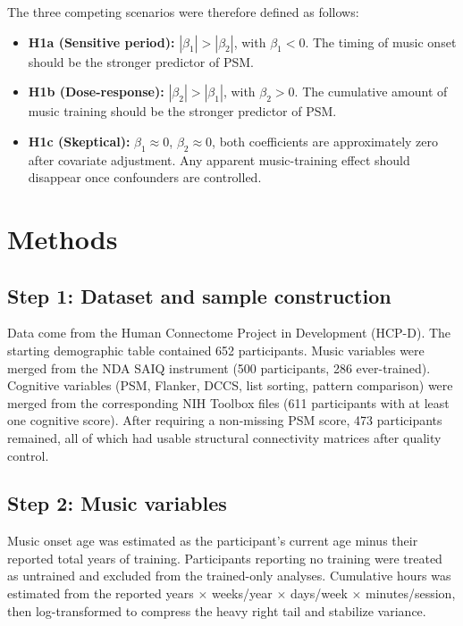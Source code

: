 \documentclass[11pt]{article}
\begin{document}
The three competing scenarios were therefore defined as follows:
\begin{itemize}[leftmargin=1.4em,itemsep=2pt]
  \item \textbf{H1a (Sensitive period):} $|\beta_1| > |\beta_2|$, with $\beta_1 < 0$.
  The timing of music onset should be the stronger predictor of PSM.
  \item \textbf{H1b (Dose-response):} $|\beta_2| > |\beta_1|$, with $\beta_2 > 0$.
  The cumulative amount of music training should be the stronger predictor of PSM.
  \item \textbf{H1c (Skeptical):} $\beta_1\approx 0$, $\beta_2\approx 0$, both coefficients are approximately zero after covariate adjustment.
  Any apparent music-training effect should disappear once confounders are controlled.
\end{itemize}

\section{Methods}

\subsection{Step 1: Dataset and sample construction}
Data come from the Human Connectome Project in Development (HCP-D). The starting demographic table contained 652 participants. Music variables were merged from the NDA SAIQ instrument (500 participants, 286 ever-trained). Cognitive variables (PSM, Flanker, DCCS, list sorting, pattern comparison) were merged from the corresponding NIH Toolbox files (611 participants with at least one cognitive score). After requiring a non-missing PSM score, 473 participants remained, all of which had usable structural connectivity matrices after quality control.

\subsection{Step 2: Music variables}
Music onset age was estimated as the participant's current age minus their reported total years of training. Participants reporting no training were treated as untrained and excluded from the trained-only analyses. Cumulative hours was estimated from the reported years $\times$ weeks/year $\times$ days/week $\times$ minutes/session, then log-transformed to compress the heavy right tail and stabilize variance.
\end{document}
